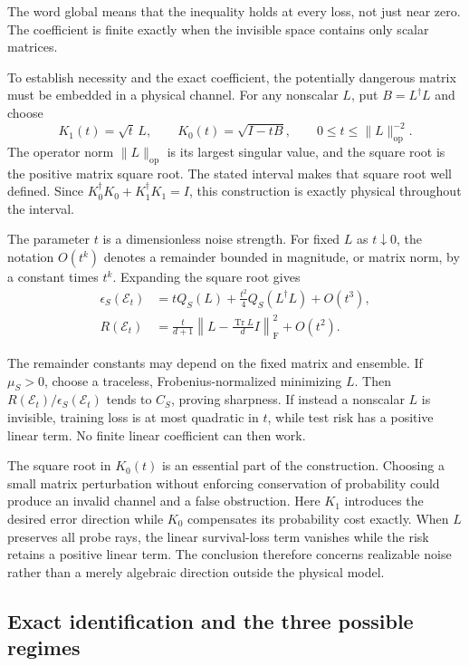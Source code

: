 \documentclass[11pt,a4paper]{article}
\newcommand{\Tr}{\operatorname{Tr}}
\newcommand{\normF}[1]{\left\lVert #1\right\rVert_{\mathrm F}}
\numberwithin{equation}{section}
\begin{document}
The word global means that the inequality holds at every loss, not just near zero. The coefficient is finite exactly when the invisible space contains only scalar matrices.

To establish necessity and the exact coefficient, the potentially dangerous matrix must be embedded in a physical channel. For any nonscalar $L$, put $B=L^\dagger L$ and choose
\[
K_1(t)=\sqrt t\,L,\qquad K_0(t)=\sqrt{I-tB},
\qquad 0\leq t\leq\|L\|_{\mathrm{op}}^{-2}.
\]
The operator norm $\|L\|_{\mathrm{op}}$ is its largest singular value, and the square root is the positive matrix square root. The stated interval makes that square root well defined. Since $K_0^\dagger K_0+K_1^\dagger K_1=I$, this construction is exactly physical throughout the interval.

\begin{samepage}
The parameter $t$ is a dimensionless noise strength. For fixed $L$ as $t\downarrow0$, the notation $O(t^k)$ denotes a remainder bounded in magnitude, or matrix norm, by a constant times $t^k$. Expanding the square root gives
\begin{align}
\epsilon_S(\mathcal E_t)
 &=tQ_S(L)+\frac{t^2}{4}Q_S(L^\dagger L)+O(t^3),\\
R(\mathcal E_t)
 &=\frac{t}{d+1}\normF{L-\frac{\Tr L}{d}I}^2+O(t^2).
\end{align}
\end{samepage}
The remainder constants may depend on the fixed matrix and ensemble. If $\mu_S>0$, choose a traceless, Frobenius-normalized minimizing $L$. Then $R(\mathcal E_t)/\epsilon_S(\mathcal E_t)$ tends to $C_S$, proving sharpness. If instead a nonscalar $L$ is invisible, training loss is at most quadratic in $t$, while test risk has a positive linear term. No finite linear coefficient can then work.

The square root in $K_0(t)$ is an essential part of the construction. Choosing a small matrix perturbation without enforcing conservation of probability could produce an invalid channel and a false obstruction. Here $K_1$ introduces the desired error direction while $K_0$ compensates its probability cost exactly. When $L$ preserves all probe rays, the linear survival-loss term vanishes while the risk retains a positive linear term. The conclusion therefore concerns realizable noise rather than a merely algebraic direction outside the physical model.

\subsection{Exact identification and the three possible regimes}
\end{document}
